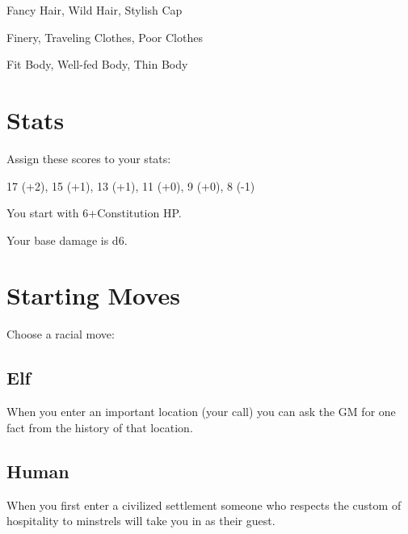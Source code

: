 Fancy Hair, Wild Hair, Stylish Cap

         

Finery, Traveling Clothes, Poor Clothes

         

Fit Body, Well-fed Body, Thin Body

       

       
\section{Stats}   
       

         

Assign these scores to your stats:

         

17 (+2), 15 (+1), 13 (+1), 11 (+0), 9 (+0), 8 (-1)

         

You start with 6+Constitution HP.

       

       

Your base damage is d6.

       
\section{Starting Moves}   
       

         
\startInstructionsAfterHeader
Choose a racial move:
\stopInstructionsAfterHeader
         

           
\subsection{Elf}   
           

When you enter an important location (your call) you can ask the GM for one fact from the history of that location.

           
\subsection{Human}   
           

When you first enter a civilized settlement someone who respects the custom of hospitality to minstrels will take you in as their guest.

         


